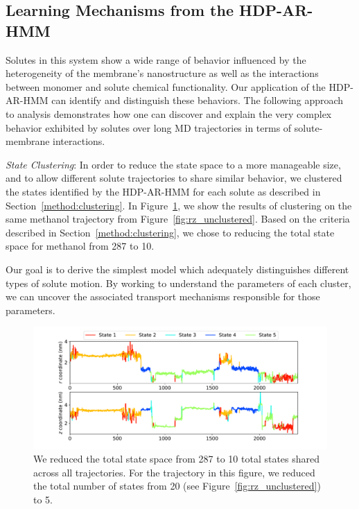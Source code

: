 \documentclass[journal=jpcbfk,manuscript=article]{achemso}
\newcommand{\nclusters}{10}
\begin{document}
  \subsection{Learning Mechanisms from the HDP-AR-HMM}\label{section:mechanisms}
  
  Solutes in this system show a wide range of behavior influenced by the 
  heterogeneity of the membrane's nanostructure as well as the interactions 
  between monomer and solute chemical functionality. Our application of the 
  HDP-AR-HMM can identify and distinguish these behaviors. The following approach 
  to analysis demonstrates how one can discover and explain the very complex
  behavior exhibited by solutes over long MD trajectories in terms of 
  solute-membrane interactions.
  
  \textit{State Clustering}: In order to reduce the state space to a more 
  manageable size, and to allow different solute trajectories to share 
  similar behavior, we clustered the states identified by the HDP-AR-HMM for each
  solute as described in Section~\ref{method:clustering}. In 
  Figure~\ref{fig:clustered_traj_MET}, we show the results of clustering on the 
  same methanol trajectory from Figure~\ref{fig:rz_unclustered}. Based on 
  the criteria described in Section~\ref{method:clustering},
  we chose to reducing the total state space for methanol from 287 to \nclusters. 
  
  Our goal is to derive the simplest model which adequately distinguishes
  different types of solute motion. By working to understand the parameters of 
  each cluster, we can uncover the associated transport mechanisms responsible
  for those parameters.
  
  \begin{figure}
  \centering
  \includegraphics[width=\textwidth]{clustered_traj_MET_ward_10.pdf}
  \caption{We reduced the total state space from 287 to 10 total states 
  shared across all trajectories. For the trajectory in this figure, we reduced
  the total number of states from 20 (see Figure~\ref{fig:rz_unclustered}) to
  5.}\label{fig:clustered_traj_MET}
  \end{figure}
  
\end{document}
